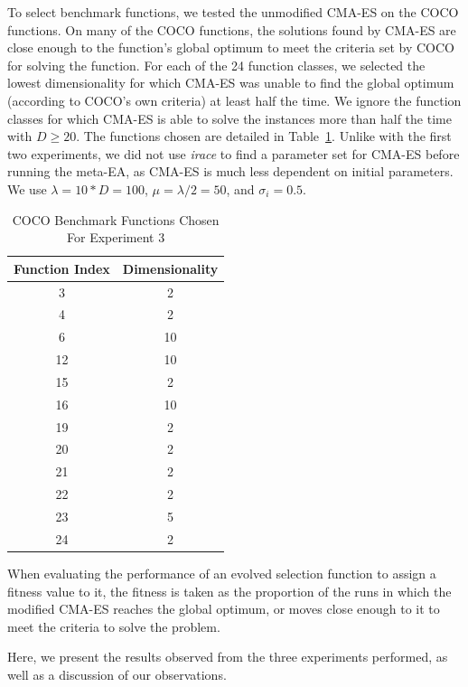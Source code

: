 \documentclass[times,12pt,titlepage]{mstogs}
\begin{document}
\begin{ThesisBody}
To select benchmark functions, we tested the unmodified CMA-ES on the COCO functions. On many of the COCO functions, the solutions found by CMA-ES are close enough to the function's global optimum to meet the criteria set by COCO for solving the function. For each of the 24 function classes, we selected the lowest dimensionality for which CMA-ES was unable to find the global optimum (according to COCO's own criteria) at least half the time. We ignore the function classes for which CMA-ES is able to solve the instances more than half the time with $D\geq20$. The functions chosen are detailed in Table~\ref{tab:experiment3chosenFunctions}. Unlike with the first two experiments, we did not use \textit{irace} to find a parameter set for CMA-ES before running the meta-EA, as CMA-ES is much less dependent on initial parameters. We use $\lambda=10*D=100$, $\mu = \lambda/2 = 50$, and $\sigma_i = 0.5$. 

\begin{table}[htb]
\centering
  \caption{COCO Benchmark Functions Chosen For Experiment 3}
  \label{tab:experiment3chosenFunctions}
  \begin{tabular}{c|c}
    \toprule
    Function Index & Dimensionality \\
    \midrule
    3 & 2\\
    \hline
    4& 2\\
    \hline
    6& 10\\
    \hline
    12& 10\\
    \hline
    15& 2\\
    \hline
    16& 10\\
    \hline
    19& 2\\
    \hline
    20& 2\\
    \hline
    21& 2\\
    \hline
    22& 2\\
    \hline
    23& 5\\
    \hline
    24& 2\\                        
	
  \bottomrule
\end{tabular}
\end{table}

When evaluating the performance of an evolved selection function to assign a fitness value to it, the fitness is taken as the proportion of the runs in which the modified CMA-ES reaches the global optimum, or moves close enough to it to meet the criteria to solve the problem.

\label{Results}
Here, we present the results observed from the three experiments performed, as well as a discussion of our observations.


\end{ThesisBody}
\end{document}
